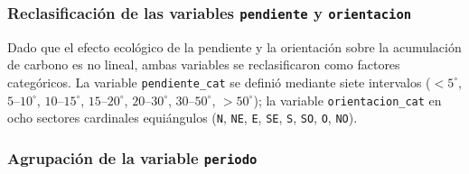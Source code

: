 

\subsubsection{Reclasificación de las variables \texttt{pendiente} y \texttt{orientacion}}

Dado que el efecto ecológico de la pendiente y la orientación sobre la acumulación de carbono es no lineal, ambas variables se reclasificaron como factores categóricos. La variable \texttt{pendiente\_cat} se definió mediante siete intervalos ($<5^\circ$, $5$--$10^\circ$, $10$--$15^\circ$, $15$--$20^\circ$, $20$--$30^\circ$, $30$--$50^\circ$, $>50^\circ$); la variable \texttt{orientacion\_cat} en ocho sectores cardinales equiángulos (\texttt{N}, \texttt{NE}, \texttt{E}, \texttt{SE}, \texttt{S}, \texttt{SO}, \texttt{O}, \texttt{NO}).

\subsubsection{Agrupación de la variable \texttt{periodo}}

